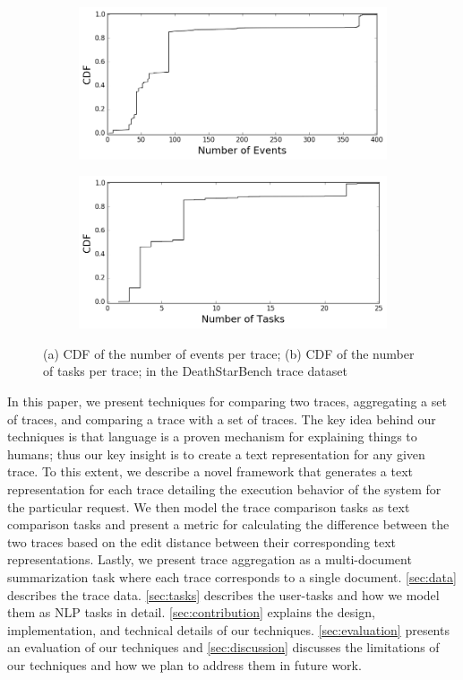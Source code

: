 \begin{figure}
    \centering%
    \begin{subfigure}{0.5\textwidth}%
        \includegraphics[width=\linewidth]{"fig/events_cdf"}%
        \caption{}%
    \end{subfigure}%
    \begin{subfigure}{0.5\textwidth}%
        \includegraphics[width=\linewidth]{"fig/tasks_cdf"}%
        \caption{}%
    \end{subfigure}%
    \caption{(a) CDF of the number of events per trace; (b) CDF of the number of tasks per trace; in the DeathStarBench trace dataset}%
    \label{fig:dataset_cdf}%
\end{figure}

In this paper, we present techniques for comparing two traces, aggregating a set of traces, and comparing
a trace with a set of traces. The key idea behind our techniques is that language is a proven mechanism
for explaining things to humans; thus our key insight is to create a text representation for any given trace.
To this extent, we describe a novel framework that generates a text representation
for each trace detailing the execution behavior of the system for the particular request. We then
model the trace comparison tasks as text comparison tasks and present a metric for calculating
the difference between the two traces based on the edit distance between their corresponding text representations.
Lastly, we present trace aggregation as a multi-document summarization task where each trace corresponds
to a single document. \autoref{sec:data} describes the trace data. \autoref{sec:tasks} describes
the user-tasks and how we model them as NLP tasks in detail. \autoref{sec:contribution} explains
the design, implementation, and technical details of our techniques. \autoref{sec:evaluation} presents
an evaluation of our techniques and \autoref{sec:discussion} discusses the limitations of our techniques
and how we plan to address them in future work.
